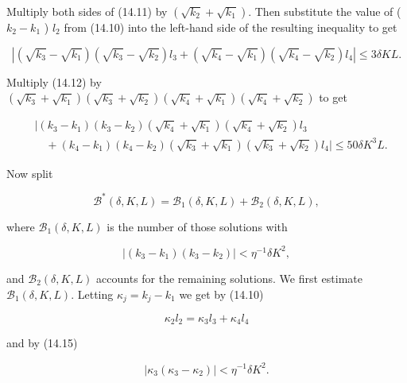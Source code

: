 \documentclass[10pt]{article}
\begin{document}
Multiply both sides of (14.11) by $\left(\sqrt{k_{2}}+\sqrt{k_{1}}\right)$. Then substitute the value of ( $k_{2}-k_{1}$ ) $l_{2}$ from (14.10) into the left-hand side of the resulting inequality to get


\begin{equation*}
\left|\left(\sqrt{k_{3}}-\sqrt{k_{1}}\right)\left(\sqrt{k_{3}}-\sqrt{k_{2}}\right) l_{3}+\left(\sqrt{k_{4}}-\sqrt{k_{1}}\right)\left(\sqrt{k_{4}}-\sqrt{k_{2}}\right) l_{4}\right| \leqslant 3 \delta K L . \tag{14.12}
\end{equation*}


Multiply (14.12) by $\left(\sqrt{k_{3}}+\sqrt{k_{1}}\right)\left(\sqrt{k_{3}}+\sqrt{k_{2}}\right)\left(\sqrt{k_{4}}+\sqrt{k_{1}}\right)\left(\sqrt{k_{4}}+\sqrt{k_{2}}\right)$ to get


\begin{align*}
& \mid\left(k_{3}-k_{1}\right)\left(k_{3}-k_{2}\right)\left(\sqrt{k_{4}}+\sqrt{k_{1}}\right)\left(\sqrt{k_{4}}+\sqrt{k_{2}}\right) l_{3} \\
& \quad+\left(k_{4}-k_{1}\right)\left(k_{4}-k_{2}\right)\left(\sqrt{k_{3}}+\sqrt{k_{1}}\right)\left(\sqrt{k_{3}}+\sqrt{k_{2}}\right) l_{4} \mid \leqslant 50 \delta K^{3} L . \tag{14.13}
\end{align*}


Now split


\begin{equation*}
\mathscr{B}^{*}(\delta, K, L)=\mathscr{B}_{1}(\delta, K, L)+\mathscr{B}_{2}(\delta, K, L), \tag{14.14}
\end{equation*}


where $\mathscr{B}_{1}(\delta, K, L)$ is the number of those solutions with


\begin{equation*}
\left|\left(k_{3}-k_{1}\right)\left(k_{3}-k_{2}\right)\right|<\eta^{-1} \delta K^{2}, \tag{14.15}
\end{equation*}


and $\mathscr{B}_{2}(\delta, K, L)$ accounts for the remaining solutions.
We first estimate $\mathscr{B}_{1}(\delta, K, L)$. Letting $\kappa_{j}=k_{j}-k_{1}$ we get by (14.10)


\begin{equation*}
\kappa_{2} l_{2}=\kappa_{3} l_{3}+\kappa_{4} l_{4} \tag{14.16}
\end{equation*}


and by (14.15)


\begin{equation*}
\left|\kappa_{3}\left(\kappa_{3}-\kappa_{2}\right)\right|<\eta^{-1} \delta K^{2} . \tag{14.17}
\end{equation*}
\end{document}
